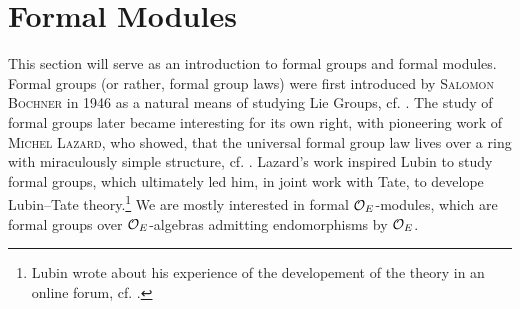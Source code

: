 \documentclass[../main.tex]{subfiles}
\begin{document}
\section{Formal Modules}
\label{sec:FormalModules}
This section will serve as an introduction to formal groups and 
formal modules. Formal groups (or rather, formal group laws) were first
introduced by \textsc{Salomon Bochner} in 1946 as a natural means of studying Lie
Groups, cf. \cite{Bochner1946FGrps}. The study of formal groups later became
interesting for its own right, with pioneering work of \textsc{Michel Lazard}, who 
showed, that the universal formal group law
lives over a ring with miraculously simple structure, cf. \cite{Lazard1955FGrps}. 
Lazard's work inspired Lubin to study formal groups, which ultimately led 
him, in joint work with Tate, to develope Lubin--Tate theory.\footnote{Lubin wrote
about his experience of the developement of the theory in an online forum, cf.
\cite{mathoverflowLUBIN}.}
We are mostly interested in formal $\mathcal{O}_E$-modules, which are formal groups
over $\mathcal{O}_E$-algebras admitting endomorphisms by $\mathcal{O}_E$.
\end{document}
